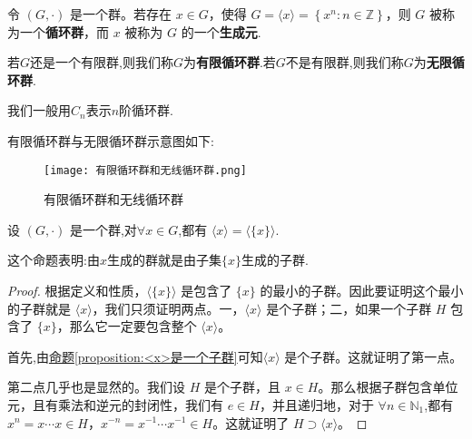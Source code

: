 \documentclass[../../main.tex]{subfiles}
\begin{document}
\begin{definition}[循环群]
令 $(G,\cdot)$ 是一个群。若存在 $x\in G$，使得 $G = \langle x\rangle=\left\{ x^n:n\in \mathbb{Z} \right\} $，则 $G$ 被称为一个\textbf{循环群}，而 $x$ 被称为 $G$ 的一个\textbf{生成元}.

若$G$还是一个有限群,则我们称$G$为\textbf{有限循环群}.若$G$不是有限群,则我们称$G$为\textbf{无限循环群}.
\end{definition}
\begin{remark}
我们一般用$C_n$表示$n$阶循环群.
\end{remark}
\begin{note}
有限循环群与无限循环群示意图如下:
\begin{figure}[H]
\centering
\texttt{[image: 有限循环群和无线循环群.png]}
\label{figure:有限循环群和无线循环群}
\caption{有限循环群和无线循环群}
\end{figure}
\end{note}

\begin{proposition}\label{proposition:由x生成的群就是由子集{x}生成的子群}
设 $(G,\cdot)$ 是一个群,对$\forall x\in G$,都有 $\langle x\rangle=\langle\{x\}\rangle$.
\end{proposition}
\begin{note}
这个命题表明:由$x$生成的群就是由子集$\{x\}$生成的子群.
\end{note}
\begin{proof}
根据定义和性质，$\langle\{x\}\rangle$ 是包含了 $\{x\}$ 的最小的子群。因此要证明这个最小的子群就是 $\langle x\rangle$，我们只须证明两点。一，$\langle x\rangle$ 是个子群；二，如果一个子群 $H$ 包含了 $\{x\}$，那么它一定要包含整个 $\langle x\rangle$。

首先,由\hyperref[proposition:<x>是一个子群]{命题\ref{proposition:<x>是一个子群}}可知$\langle x\rangle$ 是个子群。这就证明了第一点。

第二点几乎也是显然的。我们设 $H$ 是个子群，且 $x\in H$。那么根据子群包含单位元，且有乘法和逆元的封闭性，我们有 $e\in H$，并且递归地，对于 $\forall n\in\mathbb{N}_1$,都有$x^n = x\cdots x\in H$，$x^{-n}=x^{-1}\cdots x^{-1}\in H$。这就证明了 $H\supset\langle x\rangle$。 
\end{proof}
\end{document}
